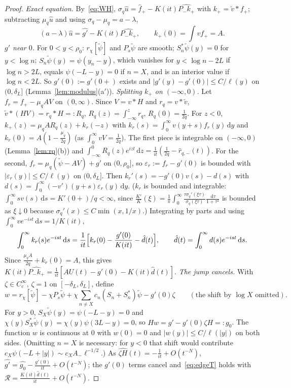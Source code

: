 \documentclass[11pt]{amsart}
\newcommand{\dd}{\,\mathrm{d}}
\newcommand{\eps}{\varepsilon}
\theoremstyle{definition}
\theoremstyle{remark}
\numberwithin{equation}{section}
\begin{document}
\begin{proof}
\emph{Exact equation.} By~\eqref{eq:WH}, $\sigma_q\hat u=\hat f_+-K(it)\widehat{P_-k_+}$ with $k_+=\tilde v*f_+$; subtracting $\mu_q\hat u$ and using $\sigma_q-\mu_q=a-\lambda$,
\[
(a-\lambda)\hat u=\widehat{g'}-K(it)\widehat{P_-k_+},\qquad k_+(0)=\int vf_+=A .
\]
\emph{$g'$ near $0$.} For $0<y<\rho_0$: $r_\chi[\tilde\psi]$ and $P_s\tilde\psi$ are smooth; $S_n^*\tilde\psi(y)=0$ for $y<\log n$; $S_n\tilde\psi(y)=\psi(y_n-y)$, which vanishes for $y<\log n-2L$ if $\log n>2L$, equals $\psi(-L-y)=0$ if $n=X$, and is an interior value if $\log n<2L$. So $g'(0):=g'(0+)$ exists and $|g'(y)-g'(0)|\le C/\ell(y)$ on $(0,\delta_L]$ (Lemma~\ref{lem:modulus}(a$'$)).
\emph{Splitting $k_+$ on $(-\infty,0)$.} Let $f_r=f_+-\mu_qAV$ on $(0,\infty)$. Since $V=v*H$ and $r_q=v*\tilde v$, $\tilde v*(HV)=r_q*H=:R_q$, $R_q(z)=\int_{-\infty}^zr_q$, $R_q(0)=\frac1{2q}$. For $z<0$, $k_+(z)=\mu_qAR_q(z)+k_r(-z)$ with $k_r(s)=\int_0^\infty v(y+s)f_r(y)\dd y$ and $k_r(0)=A(1-\frac{\mu_q}{2q})$ (as $\int_0^\infty vV=\frac1{2q}$). The first piece is integrable on $(-\infty,0)$ (Lemma~\ref{lem:rq}(b)) and $\int_{-\infty}^0R_q(z)e^{izt}\dd z=\frac1{it}(\frac1{2q}-\hat r_{q,-}(t))$. For the second, $f_r=\mu_q(\tilde\psi-AV)+g'$ on $(0,\rho_0]$, so $\eps_r:=f_r-g'(0)$ is bounded with $|\eps_r(y)|\le C/\ell(y)$ on $(0,\delta_L]$. Then $k_r'(s)=-g'(0)v(s)-d(s)$ with $d(s)=\int_0^\infty(-v')(y+s)\eps_r(y)\dd y$. ($k_r$ is bounded and integrable: $\int_0^\infty sv(s)\dd s=K'(0+)/q<\infty$, since $\frac{K'}K(\xi)=\frac1\pi\int_0^\infty\frac{\tau\sigma_q'(\xi\tau)}{\sigma_q(\xi\tau)}\frac{\dd\tau}{1+\tau^2}$ is bounded as $\xi\downarrow0$ because $\sigma_q'(x)\le C\min(x,1/x)$.) Integrating by parts and using $\int_0^\infty ve^{-ist}\dd s=1/K(it)$,
\[
\int_0^\infty k_r(s)e^{-ist}\dd s=\frac1{it}\Bigl[k_r(0)-\frac{g'(0)}{K(it)}-\hat d(t)\Bigr],\qquad\hat d(t)=\int_0^\infty d(s)e^{-ist}\dd s .
\]
Since $\frac{\mu_qA}{2q}+k_r(0)=A$, this gives $K(it)\widehat{P_-k_+}=\frac1{it}[AU(t)-g'(0)-K(it)\hat d(t)]$.
\emph{The jump cancels.} With $\zeta\in C_c^\infty$, $\zeta=1$ on $[-\delta_L,\delta_L]$, define
\begin{equation}\label{eq:w}
w=r_\chi[\tilde\psi]-\chi P_s\tilde\psi+\chi\sum_{n\ne X}c_n(S_n+S_n^*)\tilde\psi-g'(0)\zeta\qquad(\text{the shift by }\log X\text{ omitted}).
\end{equation}
For $y>0$, $S_X\tilde\psi(y)=\psi(-L-y)=0$ and $\chi(y)S_X^*\tilde\psi(y)=\chi(y)\psi(3L-y)=0$, so $Hw=g'-g'(0)\zeta H=:g_0$. The function $w$ is continuous at $0$ with $w(0)=0$ and $|w(y)|\le C/\ell(|y|)$ on both sides. (Omitting $n=X$ is necessary: for $y<0$ that shift would contribute $c_X\psi(-L+|y|)\sim c_XA_-\ell^{-1/2}$.) As $\widehat{\zeta H}(t)=-\frac1{it}+O(t^{-N})$, $\widehat{g'}=\widehat{g_0}-\frac{g'(0)}{it}+O(t^{-N})$; the $g'(0)$ terms cancel and~\eqref{eq:edgeT} holds with $\mathcal R=\frac{K(it)\hat d(t)}{it}+O(t^{-N})$.

\end{proof}
\end{document}
